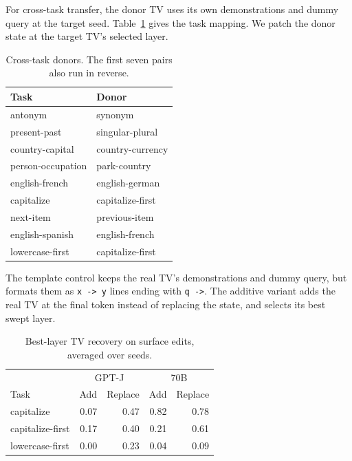 \documentclass[11pt]{article}
\begin{document}
For cross-task transfer, the donor TV uses its own demonstrations and dummy query at the target seed. Table~\ref{tab:donors} gives the task mapping. We patch the donor state at the target TV's selected layer.

\begin{table}[t]
  \centering
  \small
  \setlength{\tabcolsep}{3pt}
  \begin{tabular}{ll}
    \toprule
    Task & Donor \\
    \midrule
    antonym & synonym \\
    present-past & singular-plural \\
    country-capital & country-currency \\
    person-occupation & park-country \\
    english-french & english-german \\
    capitalize & capitalize-first \\
    next-item & previous-item \\
    \midrule
    english-spanish & english-french \\
    lowercase-first & capitalize-first \\
    \bottomrule
  \end{tabular}
  \caption{Cross-task donors. The first seven pairs also run in reverse.}
  \label{tab:donors}
\end{table}

The template control keeps the real TV's demonstrations and dummy query, but formats them as \texttt{x -> y} lines ending with \texttt{q ->}. The additive variant adds the real TV at the final token instead of replacing the state, and selects its best swept layer.

\begin{table}[t]
  \centering
  \small
  \begin{tabular}{lrrrr}
    \toprule
     & \multicolumn{2}{c}{GPT-J} & \multicolumn{2}{c}{70B} \\
    Task & Add & Replace & Add & Replace \\
    \midrule
    capitalize & 0.07 & 0.47 & 0.82 & 0.78 \\
    capitalize-first & 0.17 & 0.40 & 0.21 & 0.61 \\
    lowercase-first & 0.00 & 0.23 & 0.04 & 0.09 \\
    \bottomrule
  \end{tabular}
  \caption{Best-layer TV recovery on surface edits, averaged over seeds.}
  \label{tab:additive}
\end{table}
\end{document}
